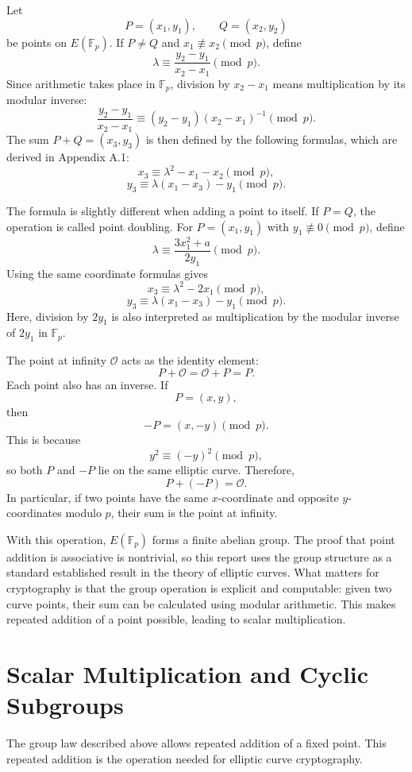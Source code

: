 \documentclass[12pt,a4paper]{article}
\begin{document}
Let
\[P = (x_1,y_1), \qquad Q = (x_2,y_2)\]
be points on \(E(\mathbb{F}_p)\). If \(P \neq Q\) and \(x_1 \not\equiv x_2 \pmod p\), define
\[\lambda \equiv \frac{y_2-y_1}{x_2-x_1} \pmod p.\]
Since arithmetic takes place in \(\mathbb{F}_p\), division by \(x_2-x_1\) means multiplication by its modular inverse:
\[\frac{y_2-y_1}{x_2-x_1}\equiv(y_2-y_1)(x_2-x_1)^{-1}\pmod p.\]
The sum \(P+Q=(x_3,y_3)\) is then defined by the following formulas, which are derived in Appendix A.1:
\[x_3 \equiv \lambda^2 - x_1 - x_2 \pmod p,\]\[y_3 \equiv \lambda(x_1-x_3)-y_1 \pmod p.\]

The formula is slightly different when adding a point to itself. If \(P=Q\), the operation is called point doubling. For \(P=(x_1,y_1)\) with \(y_1 \not\equiv 0 \pmod p\), define
\[\lambda \equiv \frac{3x_1^2+a}{2y_1} \pmod p.\]
Using the same coordinate formulas gives
\[x_3 \equiv \lambda^2 - 2x_1 \pmod p,\]\[y_3 \equiv \lambda(x_1-x_3)-y_1 \pmod p.\]
Here, division by \(2y_1\) is also interpreted as multiplication by the modular inverse of \(2y_1\) in \(\mathbb{F}_p\).

The point at infinity \(\mathcal{O}\) acts as the identity element:
\[P+\mathcal{O}=\mathcal{O}+P=P.\]
Each point also has an inverse. If
\[P=(x,y),\]
then
\[-P=(x,-y) \pmod p.\]
This is because
\[y^2 \equiv (-y)^2 \pmod p,\]
so both \(P\) and \(-P\) lie on the same elliptic curve. Therefore,
\[P+(-P)=\mathcal{O}.\]
In particular, if two points have the same \(x\)-coordinate and opposite \(y\)-coordinates modulo \(p\), their sum is the point at infinity.

With this operation, \(E(\mathbb{F}_p)\) forms a finite abelian group. The proof that point addition is associative is nontrivial, so this report uses the group structure as a standard established result in the theory of elliptic curves. What matters for cryptography is that the group operation is explicit and computable: given two curve points, their sum can be calculated using modular arithmetic. This makes repeated addition of a point possible, leading to scalar multiplication.

\section{Scalar Multiplication and Cyclic Subgroups}

The group law described above allows repeated addition of a fixed point. This repeated addition is the operation needed for elliptic curve cryptography.
\end{document}
